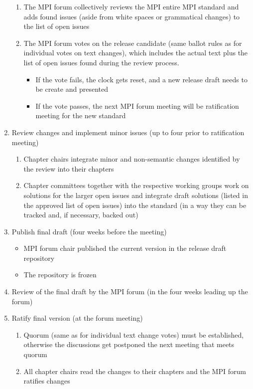 \begin{enumerate}
\begin{enumerate}
\item The MPI forum collectively reviews the MPI entire MPI standard and adds found issues (aside from white spaces or grammatical changes) to the list of open issues 
\item The MPI forum votes on the release candidate (same ballot rules as for individual votes on text changes), which includes the actual text plus the list of open issues found during the review process.
\begin{itemize}
\item If the vote fails, the clock gets reset, and a new release draft needs to be create and presented
\item If the vote passes, the next MPI forum meeting will be ratification meeting for the new standard
\end{itemize}
\end{enumerate}
\item Review changes and implement minor issues (up to four prior to ratification meeting)
\begin{enumerate}
\item Chapter chairs integrate minor and non-semantic changes identified by the review into their chapters
\item Chapter committees together with the respective working groups work on solutions for the larger open issues and integrate draft solutions (listed in  the approved list of open issues) into the standard (in a way they can be tracked and, if necessary, backed out)
\end{enumerate}
\item Publish final draft (four weeks before the meeting)
\begin{itemize}
\item MPI forum chair published the current version in the release draft repository
\item The repository is frozen
\end{itemize}
\item Review of the final  draft by the MPI forum (in the four weeks leading up the forum)
\item Ratify final version (at the forum meeting)
\begin{enumerate}
\item Quorum (same as for individual text change votes) must be established, otherwise the discussions get postponed the next meeting that meets quorum
\item All chapter chairs read the changes to their chapters and the MPI forum ratifies changes

\end{enumerate}
\end{enumerate}
